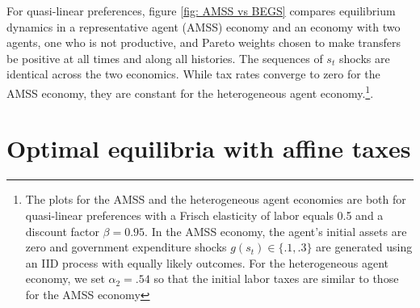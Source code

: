 \documentclass[thmsb,11pt]{article}
\begin{document}
For quasi-linear preferences, figure \ref{fig: AMSS vs BEGS} compares equilibrium dynamics in a
representative agent (AMSS) economy and an economy with two agents, one who
is not productive, and  Pareto weights chosen to make
transfers be positive at all times  and along all  histories. The sequences of $s_t$ shocks are identical across the two economics.
 While tax rates converge to zero for the AMSS economy, they are constant for the heterogeneous agent economy.\footnote{The plots for the AMSS and the heterogeneous agent economies are both  for quasi-linear preferences with a Frisch elasticity of labor equals 0.5 and a discount factor $\beta=0.95$. In the AMSS economy,  the agent's  initial assets are zero  and  government expenditure shocks $g(s_t) \in\{.1,.3\}$ are generated using an IID process with equally likely outcomes.  For the heterogeneous agent economy, we set  $\alpha_2=.54$ so that the initial labor taxes are similar to those for the AMSS economy}. %





\section{Optimal equilibria with affine taxes}\label{Sec: characterization}

\end{document}
